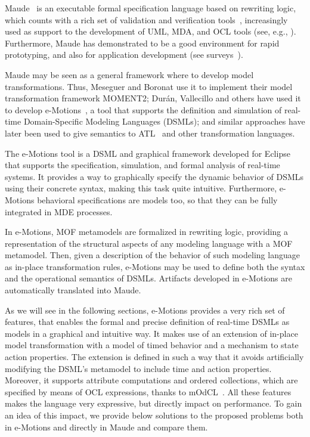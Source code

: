 
Maude~\cite{CDELMMQ:2002,CDELMMT:2007-book} is an executable formal specification language based on rewriting logic, which counts with a rich set of validation and verification tools~\cite{CDELMMT:2007-book,CDHLMO:2007}, increasingly used as support to the development of UML, MDA, and OCL tools (see, e.g., \cite{Boronat-Meseguer:08,RRDV:07-jot,Clavel-Egea:06}). Furthermore, Maude has demonstrated to be a good environment for rapid prototyping, and also for application development (see surveys~\cite{CDELMMT:2007-book,Meseguer:2012}). 

Maude may be seen as a general framework where to develop model transformations. Thus, Meseguer and Boronat use it to implement their model transformation framework MOMENT2; Dur\'an, Vallecillo and others have used it to develop e-Motions~\cite{RiveraDV10}, a tool that supports the definition and simulation of real-time Domain-Specific Modeling Languages (DSMLs); and similar approaches have later been used to give semantics to ATL~\cite{TroyaV10} and other transformation languages. 

The e-Motions tool is a DSML and graphical framework developed for Eclipse that supports the specification, simulation, and formal analysis of real-time systems. It provides a way to graphically specify the dynamic behavior of DSMLs using their concrete syntax, making this task quite intuitive. Furthermore, e-Motions behavioral specifications are models too, so that they can be fully integrated in MDE processes.

In e-Motions, MOF metamodels are formalized in rewriting logic, providing a representation of the structural aspects of any modeling language with a MOF metamodel. Then, given a description of the behavior of such modeling language as in-place transformation rules, e-Motions may be used to define both the syntax and the operational semantics of DSMLs. Artifacts developed in e-Motions are automatically translated into Maude.

As we will see in the following sections, e-Motions provides a very rich set of features, that enables the formal and precise definition of real-time DSMLs as models in a graphical and intuitive way. It makes use of an extension of in-place model transformation with a model of timed behavior and a mechanism to state action properties. The extension is defined in such a way that it avoids artificially modifying the DSML's metamodel to include time and action properties. Moreover, it supports attribute computations and ordered collections, which are specified by means of OCL
expressions, thanks to mOdCL~\cite{Roldan-Duran:2008-tr}. All these features makes the language very expressive, but directly impact on performance. To gain an idea of this impact, we provide below solutions to the proposed problems both in e-Motions and directly in Maude and compare them. 

